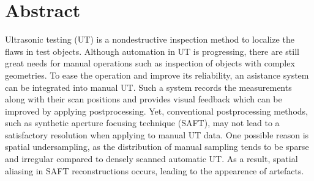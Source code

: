 %
%
\chapter*{\centering Abstract} 
Ultrasonic testing (UT) is a nondestructive inspection method to localize the flaws in test objects. Although automation in UT is progressing, there are still great needs for manual operations such as inspection of objects with complex geometries. To ease the operation and improve its reliability, an asistance system can be integrated into manual UT. Such a system records the measurements along with their scan positions and provides visual feedback which can be improved by applying postprocessing. %
Yet, conventional postprocessing methods, such as synthetic aperture focusing technique (SAFT), may not lead to a satisfactory resolution when applying to manual UT data. One possible reason is spatial undersampling, as the distribution of manual sampling tends to be sparse and irregular compared to densely scanned automatic UT. As a result, spatial aliasing in SAFT reconstructions occurs, leading to the appearence of artefacts. \par

